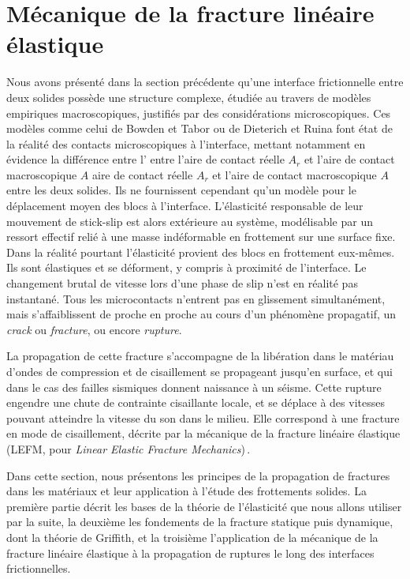 
\section{Mécanique de la fracture linéaire élastique}
\label{sec:LEFM}

Nous avons présenté dans la section précédente qu'une interface frictionnelle entre deux solides possède une structure complexe, étudiée au travers de modèles empiriques macroscopiques, justifiés par des considérations microscopiques. Ces modèles comme celui de Bowden et Tabor ou de Dieterich et Ruina font état de la réalité des contacts microscopiques à l'interface, mettant notamment en évidence la différence entre l' entre l'aire de contact réelle $A_r$ et l'aire de contact macroscopique $A$ aire de contact réelle $A_r$ et l'aire de contact macroscopique $A$ entre les deux solides. Ils ne fournissent cependant qu'un modèle pour le déplacement moyen des blocs à l'interface. 
L'élasticité responsable de leur mouvement de stick-slip est alors extérieure au système, modélisable par un ressort effectif relié à une masse indéformable en frottement sur une surface fixe.
Dans la réalité pourtant l'élasticité provient des blocs en frottement eux-mêmes. Ils sont élastiques et se déforment, y compris à proximité de l'interface. Le changement brutal de vitesse lors d'une phase de slip n'est en réalité pas instantané. Tous les microcontacts n'entrent pas en glissement simultanément, mais s'affaiblissent de proche en proche au cours d'un phénomène propagatif, un \textit{crack} ou \textit{fracture}, ou encore \textit{rupture}.

La propagation de cette fracture s'accompagne de la libération dans le matériau d'ondes de compression et de cisaillement se propageant jusqu'en surface, et qui dans le cas des failles sismiques donnent naissance à un séisme. Cette rupture engendre une chute de contrainte cisaillante locale, et se déplace à des vitesses pouvant atteindre la vitesse du son dans le milieu. Elle correspond à une fracture en mode de cisaillement, décrite par la mécanique de la fracture linéaire élastique (LEFM, pour \textit{Linear Elastic Fracture Mechanics})\,\cite{svetlizky_brittle_2019}.


Dans cette section, nous présentons les principes de la propagation de fractures dans les matériaux et leur application à l'étude des frottements solides. La première partie décrit les bases de la théorie de l'élasticité que nous allons utiliser par la suite, la deuxième les fondements de la fracture statique puis dynamique, dont la théorie de Griffith, et la troisième l'application de la mécanique de la fracture linéaire élastique à la propagation de ruptures le long des interfaces frictionnelles.






